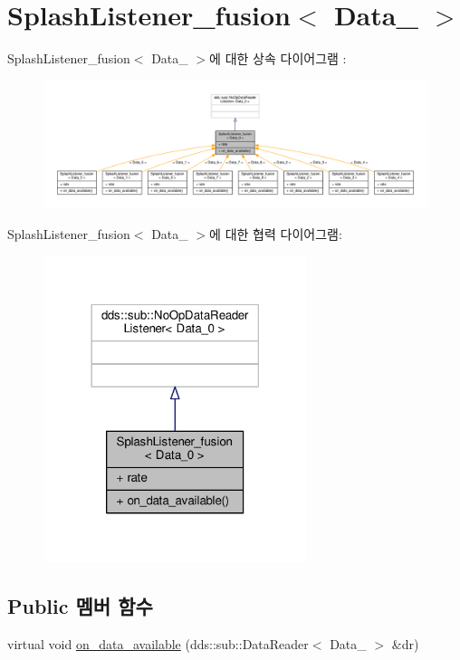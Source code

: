 \hypertarget{classSplashListener__fusion}{}\section{Splash\+Listener\+\_\+fusion$<$ Data\+\_ $>$}
\label{classSplashListener__fusion}


Splash\+Listener\+\_\+fusion$<$ Data\+\_ $>$에 대한 상속 다이어그램 \+: \nopagebreak
\begin{figure}[H]
\begin{center}
\leavevmode
\includegraphics[width=350pt]{classSplashListener__fusion__inherit__graph}
\end{center}
\end{figure}


Splash\+Listener\+\_\+fusion$<$ Data\+\_ $>$에 대한 협력 다이어그램\+:\nopagebreak
\begin{figure}[H]
\begin{center}
\leavevmode
\includegraphics[width=218pt]{classSplashListener__fusion__coll__graph}
\end{center}
\end{figure}
\subsection*{Public 멤버 함수}
\begin{DoxyCompactItemize}
\item 
virtual void \hyperlink{classSplashListener__fusion_a788a81278a9fae7bd3af3855cec5abe9}{on\+\_\+data\+\_\+available} (dds\+::sub\+::\+Data\+Reader$<$ Data\+\_ $>$ \&dr)
\end{DoxyCompactItemize}
